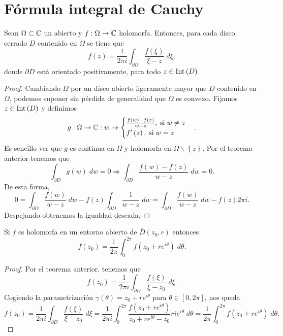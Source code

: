 \section{Fórmula integral de Cauchy}
\begin{theorem}
Sean $\displaystyle \Omega\subset \mathbb{C} $ un abierto y $\displaystyle f : \Omega \to \mathbb{C} $ holomorfa. Entonces, para cada disco cerrado $\displaystyle D $ contenido en $\displaystyle \Omega  $ se tiene que 
\[f\left(z\right)=\frac{1}{2\pi i}\int _{\partial D}\frac{f\left(\xi\right)}{\xi-z} \; d\xi ,\]
donde $\displaystyle \partial D $ está orientado positivamente, para todo $\displaystyle z \in \operatorname{Int}\left(D\right) $. 
\end{theorem}
\begin{proof}
Cambiando $\displaystyle \Omega  $ por un disco abierto ligeramente mayor que $\displaystyle D $ contenido en $\displaystyle \Omega  $, podemos suponer sin pérdida de generalidad que $\displaystyle \Omega  $ es convexo. Fijamos $\displaystyle z \in \operatorname{Int}\left(D\right) $ y definimos
\[g : \Omega \to \mathbb{C} : w \to 
\begin{cases}
\frac{f\left(w\right)-f\left(z\right)}{w-z}, \; \text{si} \; w \neq z \\
f'\left(z\right), \; \text{si} \; w = z
\end{cases}
.\]
Es sencillo ver que $\displaystyle g $ es continua en $\displaystyle \Omega  $ y holomorfa en $\displaystyle \Omega\backslash \left\{ z\right\}  $. Por el teorema anterior tenemos que 
\[\int _{\partial D}g\left(w\right) \; dw = 0 \Rightarrow \int _{\partial D}\frac{f\left(w\right)-f\left(z\right)}{w-z} \; dw = 0 .\]
De esta forma, 
\[0 = \int _{\partial D}\frac{f\left(w\right)}{w-z} \; dw - f\left(z\right)\int _{\partial D}\frac{1}{w-z} \; dw = \int _{\partial D}\frac{f\left(w\right)}{w-z} \; dw -f\left(z\right)2\pi i.\]
Despejando obtenemos la igualdad deseada.
\end{proof}
\begin{colorary}
Si $\displaystyle f $ es holomorfa en un entorno abierto de $\displaystyle \overline{D}\left(z_{0}, r\right) $ entonces
\[ f\left(z_{0}\right)=\frac{1}{2\pi }\int^{2\pi }_{0} f\left(z_{0} + re^{i\theta }\right) \; d\theta  .\]
\end{colorary}
\begin{proof}
	Por el teorema anterior, tenemos que 
	\[f\left(z_{0}\right)=\frac{1}{2\pi i}\int _{\partial D}\frac{f\left(\xi\right)}{\xi - z_{0}} \; d\xi .\]
	Cogiendo la parametrización $\displaystyle \gamma\left(\theta \right)=z_{0} + re^{i\theta } $ para $\displaystyle \theta \in \left[0, 2\pi \right]  $, nos queda
	\[
		f\left(z_{0}\right)=  \frac{1}{2\pi i}\int _{\partial D} \frac{f\left(\xi\right)}{\xi-z_{0}}\; d\xi  = \frac{1}{2\pi i}\int^{2\pi }_{0} \frac{f\left(z_{0} + re^{i\theta }\right)}{z_{0}+re^{i\theta }-z_{0}}rie^{i\theta } \; d\theta = \frac{1}{2\pi }\int^{2\pi }_{0} f\left(z_{0}+re^{i\theta }\right) \; d\theta.
	\]
\end{proof}
